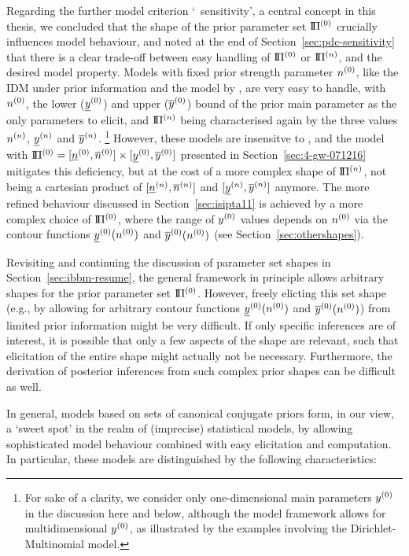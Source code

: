 Regarding the further model criterion `\pdc\ sensitivity',
a central concept in this thesis,
we concluded that the shape of the prior parameter set $\text{I}\!\Pi^{(0)}$
crucially influences model behaviour, 
and noted at the end of Section~\ref{sec:pdc-sensitivity} that
there is a clear trade-off between easy handling of $\text{I}\!\Pi^{(0)}$ or $\text{I}\!\Pi^{(n)}$, and the desired model property.
Models with fixed prior strength parameter $n^{(0)}$,
like the IDM under prior information and the model by \textcite{2005:quaeghebeurcooman},
are very easy to handle,
with $n^{(0)}$, the lower ($\underline{y}^{(0)}$) and upper ($\overline{y}^{(0)}$) bound of the prior main parameter as the only parameters to elicit,
and $\text{I}\!\Pi^{(n)}$ being characterised again by the three values $n^{(n)}$, $\underline{y}^{(n)}$ and $\overline{y}^{(n)}$.%
\footnote{For sake of a clarity,
we consider only one-dimensional main parameters $y^{(0)}$ in the discussion here and below,
although the model framework allows for multidimensional $y^{(0)}$,
as illustrated by the examples involving the Dirichlet-Multinomial model.}
However, these models are insensitve to \pdc,
and the model with $\text{I}\!\Pi^{(0)} = [\underline{n}^{(0)}, \overline{n}^{(0)}] \times [\underline{y}^{(0)}, \overline{y}^{(0)}]$
presented in Section~\ref{sec:4-gw-071216}
mitigates this deficiency, but at the cost of a more complex shape of $\text{I}\!\Pi^{(n)}$,
not being a cartesian product of $[\underline{n}^{(n)}, \overline{n}^{(n)}]$ and $[\underline{y}^{(n)}, \overline{y}^{(n)}]$ anymore.
The more refined behaviour discussed in Section~\ref{sec:isipta11}
is achieved by a more complex choice of $\text{I}\!\Pi^{(0)}$,
where the range of $y^{(0)}$ values depends on $n^{(0)}$
via the contour functions $\underline{y}^{(0)}(n^{(0)})$ and $\overline{y}^{(0)}(n^{(0)})$
(see Section~\ref{sec:othershapes}).

Revisiting and continuing the discussion of parameter set shapes in Section~\ref{sec:ibbm-resume},
the general framework in principle allows arbitrary shapes for the prior parameter set $\text{I}\!\Pi^{(0)}$.
However, freely elicting this set shape
(e.g., by allowing for arbitrary contour functions $\underline{y}^{(0)}(n^{(0)})$ and $\overline{y}^{(0)}(n^{(0)})$)
from limited prior information might be very difficult.
If only specific inferences are of interest,
it is possible that only a few aspects of the shape are relevant,
such that elicitation of the entire shape might actually not be necessary.
Furthermore, the derivation of posterior inferences from
such complex prior shapes can be difficult as well.

In general, %
models based on sets of canonical conjugate priors form, in our view,
a `sweet spot' in the realm of (imprecise) statistical models,
by allowing sophisticated model behaviour
combined with easy elicitation and computation.
In particular,
these models are distinguished by the following characteristics:

